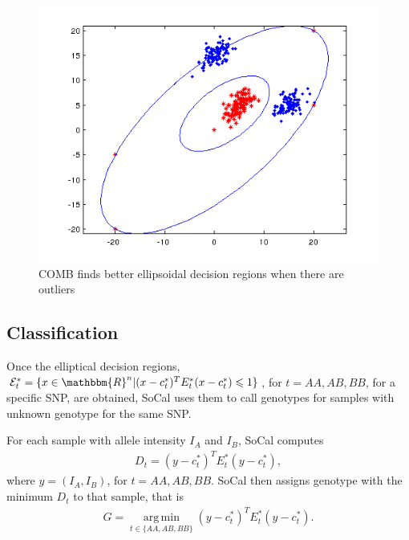 \documentclass{scrartcl}
\begin{document}
\begin{figure}[H]
    \centering
    \includegraphics[scale=0.75]
    {method_figures/comb_outlier.png}
    \caption{COMB finds better ellipsoidal decision regions when there are
             outliers}
    \label{fig:method_outlier}
\end{figure}

\subsection{Classification}

\par
Once the elliptical decision regions,
$\mathcal{E}_{t}^{*}=
\{x \in \mathbbm{R}^{n} | (x-c_t^{*})^TE_t^{*}(x-c_t^{*})\leqslant1\}$, for
$t=AA,AB,BB$, for a specific SNP, are obtained, SoCal uses them to call
genotypes for samples with unknown genotype for the same SNP.

\par
For each sample with allele intensity $I_A$ and $I_B$, SoCal computes
\begin{gather*}
D_t=(y-c_t^{*})^TE_t^{*}(y-c_t^{*}),
\end{gather*}
where $y=(I_A,I_B)$, for $t=AA,AB,BB$.
SoCal then assigns genotype with the minimum $D_t$ to that sample, that is
\begin{gather*}
G=\operatorname*{arg\,min}_{t\in \{AA,AB,BB\}}
(y-c_t^{*})^TE_t^{*}(y-c_t^{*}).
\end{gather*}


\end{document}
